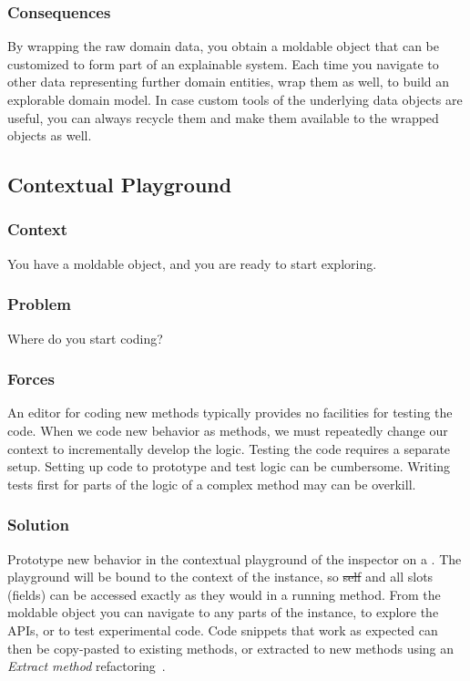 \documentclass[sigconf]{acmart}
\newcommand{\pattern}[1]{\emph{\nameref{pat:#1}}\xspace}
\begin{document}
\subsubsection*{Consequences}

By wrapping the raw domain data, you obtain a moldable object that can be customized to form part of an explainable system.
Each time you navigate to other data representing further domain entities, wrap them as well, to build an explorable domain model.
In case custom tools of the underlying data objects are useful, you can always recycle them and make them available to the wrapped objects as well.

\subsection*{Contextual Playground}\label{pat:contextualPlayground}
\subsubsection*{Context}
You have a moldable object, and you are ready to start exploring.

\subsubsection*{Problem}
Where do you start coding?

\subsubsection*{Forces}
An editor for coding new methods typically provides no facilities for testing the code.
When we code new behavior as methods, we must repeatedly change our context to incrementally develop the logic.
Testing the code requires a separate setup.
Setting up code to prototype and test logic can be cumbersome.
Writing tests first for parts of the logic of a complex method may can be overkill.

\subsubsection*{Solution}
Prototype new behavior in the contextual playground of the inspector on a \pattern{moldableObject}.
The playground will be bound to the context of the instance, so \st{self} and all slots (\ie fields) can be accessed exactly as they would in a running method.
From the moldable object you can navigate to any parts of the instance, to explore the APIs, or to test experimental code.
Code snippets that work as expected can then be copy-pasted to existing methods, or extracted to new methods using an \emph{Extract method} refactoring~\cite{Fowl99a}.
\end{document}
